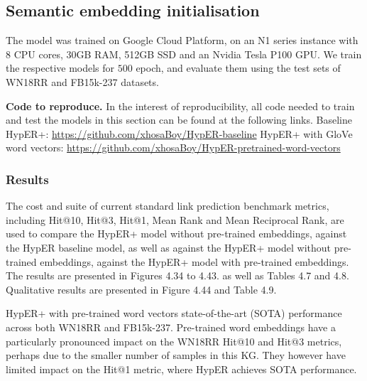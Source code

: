 
\subsection{Semantic embedding initialisation}

\noindent The model was trained on Google Cloud Platform, on an N1 series instance with  8 CPU cores, 30GB RAM, 512GB SSD and an Nvidia Tesla P100 GPU. We train the respective models for $ 500 $ epoch, and evaluate them using the test sets of WN18RR and FB15k-237 datasets. \par 

\noindent \textbf{Code to reproduce.} In the interest of reproducibility, all code needed to train and test the models in this section can be found at the following links. \newline
Baseline HypER+: \url{https://github.com/xhosaBoy/HypER-baseline} \newline
HypER+ with GloVe word vectors: \url{https://github.com/xhosaBoy/HypER-pretrained-word-vectors} \par

\subsubsection{Results}
The cost and suite of current standard link prediction benchmark metrics, including Hit@10, Hit@3, Hit@1, Mean Rank and Mean Reciprocal Rank, are used to compare the HypER+ model without pre-trained embeddings, against the HypER baseline model, as well as against the HypER+ model without pre-trained embeddings, against the HypER+ model with pre-trained embeddings. The results are presented in Figures 4.34 to 4.43. as well as Tables 4.7 and 4.8. Qualitative results are presented in Figure 4.44 and Table 4.9. \par

\noindent HypER+ with pre-trained word vectors state-of-the-art (SOTA) performance across both WN18RR and FB15k-237. Pre-trained word embeddings have a particularly pronounced impact on the WN18RR Hit@10 and Hit@3 metrics, perhaps due to the smaller number of samples in this KG. They however have limited impact on the Hit@1 metric, where HypER achieves SOTA performance.

\bigskip



